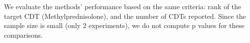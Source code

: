 We evaluate the methods' performance based on the same criteria: rank of the target CDT (Methylprednisolone), and the number of CDTs reported. 
Since the sample size is small (only 2 experiments), we do not compute p values for these comparisons.

%

